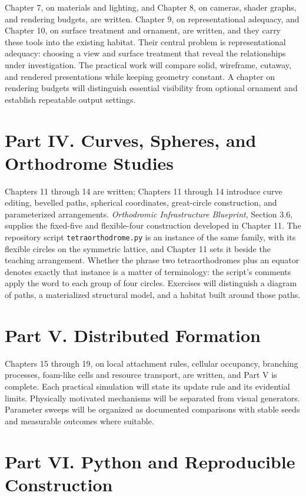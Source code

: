 \documentclass[11pt,openany]{book}
\begin{document}
Chapter 7, on materials and lighting, and Chapter 8, on cameras, shader graphs, and rendering budgets, are written. Chapter 9, on representational adequacy, and Chapter 10, on surface treatment and ornament, are written, and they carry these tools into the existing habitat. Their central problem is representational adequacy: choosing a view and surface treatment that reveal the relationships under investigation. The practical work will compare solid, wireframe, cutaway, and rendered presentations while keeping geometry constant. A chapter on rendering budgets will distinguish essential visibility from optional ornament and establish repeatable output settings.

\section*{Part IV. Curves, Spheres, and Orthodrome Studies}

Chapters 11 through 14 are written; Chapters 11 through 14 introduce curve editing, bevelled paths, spherical coordinates, great-circle construction, and parameterized arrangements. \emph{Orthodromic Infrastructure Blueprint}, Section 3.6, supplies the fixed-five and flexible-four construction developed in Chapter 11. The repository script \texttt{tetraorthodrome.py} is an instance of the same family, with its flexible circles on the symmetric lattice, and Chapter 11 sets it beside the teaching arrangement. Whether the phrase two tetraorthodromes plus an equator denotes exactly that instance is a matter of terminology: the script's comments apply the word to each group of four circles. Exercises will distinguish a diagram of paths, a materialized structural model, and a habitat built around those paths.

\section*{Part V. Distributed Formation}

Chapters 15 through 19, on local attachment rules, cellular occupancy, branching processes, foam-like cells and resource transport, are written, and Part V is complete. Each practical simulation will state its update rule and its evidential limits. Physically motivated mechanisms will be separated from visual generators. Parameter sweeps will be organized as documented comparisons with stable seeds and measurable outcomes where suitable.

\section*{Part VI. Python and Reproducible Construction}
\end{document}
